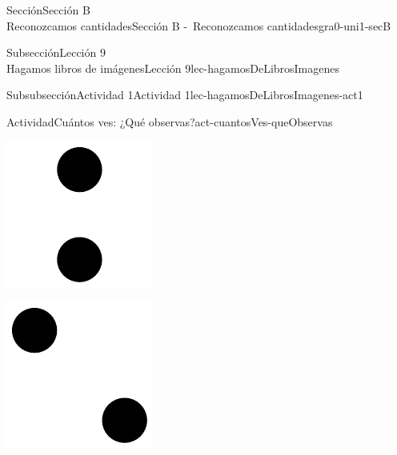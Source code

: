 \begin{sectionptx}{Sección}{{\Large Sección B\\}Reconozcamos cantidades}{}{Sección B -~Reconozcamos cantidades}{}{}{gra0-uni1-secB}
\begin{subsectionptx}{Subsección}{{\normalsize Lección 9\\[-0.05cm]}Hagamos libros de imágenes}{}{Lección 9}{}{}{lec-hagamosDeLibrosImagenes}
\begin{subsubsectionptx}{Subsubsección}{Actividad 1}{}{Actividad 1}{}{}{lec-hagamosDeLibrosImagenes-act1}
\begin{activity}{Actividad}{Cuántos ves: ¿Qué observas?}{act-cuantosVes-queObservas}
\begin{sidebyside}{2}{0}{0}{0}
\begin{sbspanel}{0.5}
\includegraphics[max width=\linewidth, center]{external/svg-source/tikz-file-148154.pdf}
\end{sbspanel}%
\begin{sbspanel}{0.5}%
\includegraphics[max width=\linewidth, center]{external/svg-source/tikz-file-147348.pdf}

\end{sbspanel}
\end{sidebyside}
\end{activity}
\end{subsubsectionptx}
\end{subsectionptx}
\end{sectionptx}
